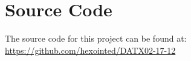 \chapter{Source Code}
The source code for this project can be found at:
\href{url}{https://github.com/hexointed/DATX02-17-12}
